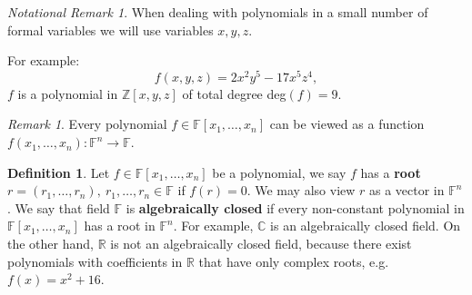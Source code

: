 \documentclass[thesis=M,english]{FITthesis}[2012/10/20]
\theoremstyle{remark}
\newtheorem*{RM}{Remark}
\newtheorem*{NRM}{Notational Remark}
\theoremstyle{definition}
\newtheorem{DF}{Definition}[section]
\begin{document}
\begin{NRM}
\noindent When dealing with polynomials in a small number of formal variables we will use variables $x,y,z$. 
\end{NRM}
\noindent For example:
$$
f(x,y,z) = 2x^2y^5 - 17x^5z^4,
$$
$f$ is a polynomial in $\mathbb{Z}[x,y,z]$ of total degree deg$(f)=9.$
\begin{RM}
Every polynomial $f \in \mathbb{F}[x_1,\ldots,x_n]$ can be viewed as a function $f(x_1,\ldots,x_n) : \mathbb{F}^n \to \mathbb{F}$.
\end{RM}
\begin{DF}
Let $f \in \mathbb{F}[x_1,\ldots,x_n]$ be a polynomial, we say $f$ has a \textbf{root} $r = (r_1, \ldots, r_n),\ r_1, \ldots, r_n \in \mathbb{F}$ if $f(r) = 0.$ We may also view $r$ as a vector in $\mathbb{F}^n$. We say that field $\mathbb{F}$ is \textbf{algebraically closed} if every non-constant polynomial in $\mathbb{F}[x_1,\ldots,x_n]$ has a root in $\mathbb{F}^n$. For example, $\mathbb{C}$ is an algebraically closed field. On the other hand, $\mathbb{R}$ is not an algebraically  closed field, because there exist polynomials with coefficients in $\mathbb{R}$ that have only complex roots, e.g. $f(x) = x^2 + 16$.
\end{DF}
\end{document}
